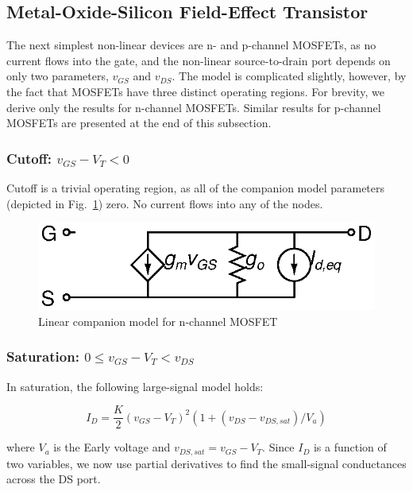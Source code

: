 \documentclass{article}
\begin{document}
\pagebreak

\subsection{Metal-Oxide-Silicon Field-Effect Transistor}

The next simplest non-linear devices are n- and p-channel MOSFETs, as no current flows into the gate, and the non-linear source-to-drain port depends on only two parameters, $v_{GS}$ and $v_{DS}$. The model is complicated slightly, however, by the fact that MOSFETs have three distinct operating regions.  For brevity, we derive only the results for n-channel MOSFETs. Similar results for p-channel MOSFETs are presented at the end of this subsection.

\subsubsection{Cutoff: $ v_{GS} - V_T < 0 $ }

Cutoff is a trivial operating region, as all of the companion model parameters (depicted in Fig.~\ref{fig:nmos}) zero.  No current flows into any of the nodes.

\begin{figure}[h]
\begin{center}
\includegraphics{fig/nmos.eps}
\caption{Linear companion model for n-channel MOSFET \label{fig:nmos}}
\end{center}
\end{figure}

\subsubsection{Saturation: $ 0 \leq v_{GS} - V_T < v_{DS} $}

In saturation, the following large-signal model holds:

\begin{equation}
I_D=\frac{K}{2}(v_{GS}-V_T)^2 (1+(v_{DS}-v_{DS,sat})/V_a)
\end{equation}

where $V_a$ is the Early voltage and $v_{DS,sat}=v_{GS}-V_T$. Since $I_D$ is a function of two variables, we now use partial derivatives to find the small-signal conductances across the DS port.
\end{document}
